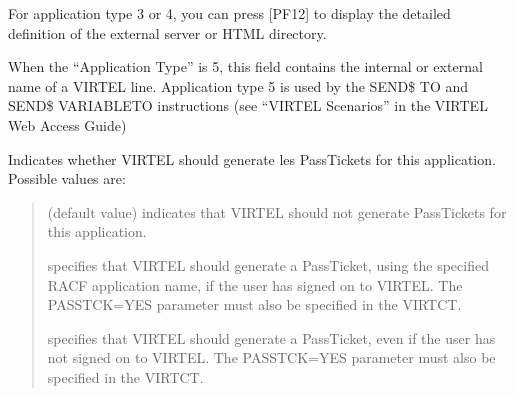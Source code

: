 \documentclass[letterpaper,10pt,english]{sphinxmanual}
\begin{document}
\begin{description}
\sphinxAtStartPar
For application type 3 or 4, you can press {[}PF12{]} to display the detailed definition of the external server or HTML directory.

\sphinxAtStartPar
When the “Application Type” is 5, this field contains the internal or external name of a VIRTEL line. Application type 5 is used by the SEND\$ TO and SEND\$ VARIABLE\sphinxhyphen{}TO instructions (see “VIRTEL Scenarios” in the VIRTEL Web Access Guide)

\sphinxAtStartPar
Indicates whether VIRTEL should generate les PassTickets for this application. Possible values are:
\begin{quote}
\begin{description}
\sphinxAtStartPar
(default value) indicates that VIRTEL should not generate PassTickets for this application.

\sphinxAtStartPar
specifies that VIRTEL should generate a PassTicket, using the specified RACF application name, if the user has signed on to VIRTEL. The PASSTCK=YES parameter must also be specified in the VIRTCT.

\sphinxAtStartPar
specifies that VIRTEL should generate a PassTicket, even if the user has not signed on to VIRTEL. The PASSTCK=YES parameter must also be specified in the VIRTCT.

\end{description}
\end{quote}

\end{description}
\end{document}
